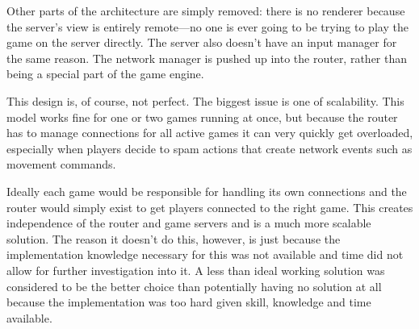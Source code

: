 Other parts of the architecture are simply removed: there is no renderer because the server's view is entirely remote---no one is ever going to be trying to play the game on the server directly. The server also doesn't have an input manager for the same reason. The network manager is pushed up into the router, rather than being a special part of the game engine.

This design is, of course, not perfect. The biggest issue is one of scalability. This model works fine for one or two games running at once, but because the router has to manage connections for all active games it can very quickly get overloaded, especially when players decide to spam actions that create network events such as movement commands.

Ideally each game would be responsible for handling its own connections and the router would simply exist to get players connected to the right game. This creates independence of the router and game servers and is a much more scalable solution. The reason it doesn't do this, however, is just because the implementation knowledge necessary for this was not available and time did not allow for further investigation into it. A less than ideal working solution was considered to be the better choice than potentially having no solution at all because the implementation was too hard given skill, knowledge and time available.





